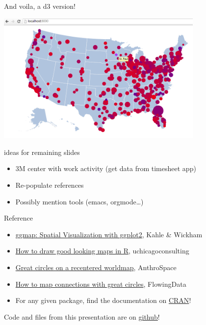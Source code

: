 \documentclass[sans,aspectratio=169,presentation,bigger,fleqn]{beamer}
\begin{document}
\begin{frame}[label=sec-32]{And voila, a d3 version!}
\begin{center}
\includegraphics[height=6.5cm]{./img/transpo-d3.png}
\end{center}
\end{frame}
\begin{frame}[label=sec-33]{ideas for remaining slides}
\begin{itemize}
\item 3M center with work activity (get data from timesheet app)
\item Re-populate references
\item Possibly mention tools (emacs, orgmode\ldots{})
\end{itemize}
\end{frame}
\begin{frame}[label=sec-34]{Reference}
\begin{itemize}
\item \href{http://stat405.had.co.nz/ggmap.pdf}{ggmap: Spatial Visualization with ggplot2}, Kahle \& Wickham
\item \href{http://uchicagoconsulting.wordpress.com/2011/04/18/how-to-draw-good-looking-maps-in-r/}{How to draw good looking maps in R}, uchicagoconsulting
\item \href{http://www.stanford.edu/~cengel/cgi-bin/anthrospace/great-circles-on-a-recentered-worldmap-in-ggplot}{Great circles on a recentered worldmap}, AnthroSpace
\item \href{http://flowingdata.com/2011/05/11/how-to-map-connections-with-great-circles/}{How to map connections with great circles}, FlowingData
\item For any given package, find the documentation on \href{http://cran.r-project.org/}{CRAN}!
\end{itemize}

\vspace{0.5cm}

Code and files from this presentation are on \href{https://github.com/jwhendy/devFest-geo}{github}!
\end{frame}
\end{document}
